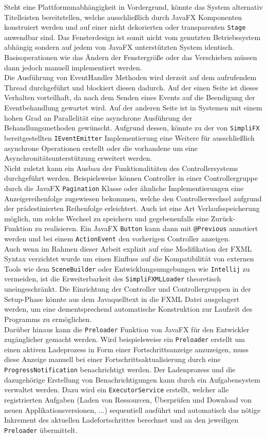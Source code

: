 Steht eine Plattformunabhängigkeit in Vordergrund, könnte das System alternativ Titelleisten bereitstellen, welche ausschließlich durch JavaFX Komponenten konstruiert werden und auf einer nicht dekorierten oder transparenten \texttt{Stage} anwendbar sind. Das Fensterdesign ist somit nicht vom genutzten Betriebssystem abhängig sondern auf jedem von JavaFX unterstützten System identisch. Basisoperationen wie das Ändern der Fenstergröße oder das Verschieben müssen dann jedoch manuell implementiert werden.\\
Die Ausführung von EventHandler Methoden wird derzeit auf dem aufrufendem Thread durchgeführt und blockiert diesen dadurch. Auf der einen Seite ist dieses Verhalten vorteilhaft, da nach dem Senden eines Events auf die Beendigung der Eventbehandlung gewartet wird. Auf der anderen Seite ist in Systemen mit einem hohen Grad an Parallelität eine asynchrone Ausführung der Behandlungsmethoden gewünscht. Aufgrund dessen, könnte zu der von \texttt{SimpliFX} bereitgestellten \texttt{IEventEmitter} Implementierung eine Weitere für ausschließlich asynchrone Operationen erstellt oder die vorhandene um eine Asynchronitätsunterstützung erweitert werden.\\
Nicht zuletzt kann ein Ausbau der Funktionalitäten des Controllersystems durchgeführt werden. Beispielsweise können Controller in einer Controllergruppe durch die JavaFX \texttt{Pagination} Klasse oder ähnliche Implementierungen eine Anzeigereihenfolge zugewiesen bekommen, welche den Controllerwechsel aufgrund der prädestinierten Reihenfolge erleichtert. Auch ist eine Art Verlaufsspeicherung möglich, um solche Wechsel zu speichern und gegebenenfalls eine Zurück-Funktion zu realisieren. Ein JavaFX \texttt{Button} kann dann mit \texttt{@Previous} annotiert werden und bei einem \texttt{ActionEvent} den vorherigen Controller anzeigen.\\
Auch wenn im Rahmen dieser Arbeit explizit auf eine Modifikation der FXML Syntax verzichtet wurde um einen Einfluss auf die Kompatibilität von externen Tools wie dem \texttt{SceneBuilder} oder Entwicklungsumgebungen wie \texttt{Intellij} zu vermeiden, ist die Erweiterbarkeit des \texttt{SimpliFXMLLoader} theoretisch uneingeschränkt. Die Einrichtung der Controller und Controllergruppen in der Setup-Phase könnte aus dem Javaquelltext in die FXML Datei ausgelagert werden, um eine dementsprechend automatische Konstruktion zur Laufzeit des Programms zu ermöglichen.\\
Darüber hinaus kann die \texttt{Preloader} Funktion von JavaFX für den Entwickler zugänglicher gemacht werden. Wird beispielsweise ein \texttt{Preloader} erstellt um einen aktiven Ladeprozess in Form einer Fortschrittsanzeige anzuzeigen, muss diese Anzeige manuell bei einer Fortschrittsaktualisierung durch eine \texttt{ProgressNotification} benachrichtigt werden. Der Ladenprozess und die dazugehörige Erstellung von Benachrichtigungen kann durch ein Aufgabensystem verwaltet werden. Dazu wird ein \texttt{ExecutorService} erstellt, welcher alle registrierten Aufgaben (Laden von Ressourcen, Überprüfen und Download von neuen Applikationsversionen, ...) sequentiell ausführt und automatisch das nötige Inkrement des aktuellen Ladefortschrittes berechnet und an den jeweiligen \texttt{Preloader} übermittelt.
